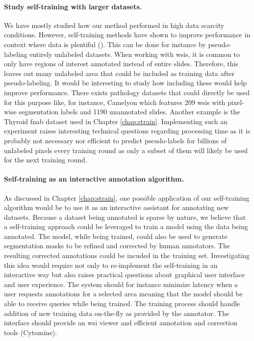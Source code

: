 \paragraph{Study self-training with larger datasets.} We have mostly studied how our method performed in high data scarcity conditions. However, self-training methods have shown to improve performance in context where data is plentiful (\eg \cite{zoph2020rethinking}). This can be done for instance by pseudo-labeling entirely unlabeled datasets. When working with \acrlong{wsi}s, it is common to only have regions of interest annotated instead of entire slides. Therefore, this leaves out many unlabeled area that could be included as training data after pseudo-labeling. It would be interesting to study how including these would help improve performance. There exists pathology datasets that could directly be used for this purpose like, for instance, Camelyon \cite{litjens2018camelyon} which features 209 \acrlong{wsi}s with pixel-wise segmentation labels and 1190 unannotated slides. Another example is the Thyroid \acrshort{fnab} dataset used in Chapter \ref{chap:strain}. Implementing such an experiment raises interesting technical questions regarding processing time as it is probably not necessary nor efficient to predict pseudo-labels for billions of unlabeled pixels every training round as only a subset of them will likely be used for the next training round.  

\paragraph{Self-training as an interactive annotation algorithm.} As discussed in Chapter \ref{chap:strain}, one possible application of our self-training algorithm would be to use it as an interactive assistant for annotating new datasets. Because a dataset being annotated is sparse by nature, we believe that a self-training approach could be leveraged to train a model using the data being annotated. The model, while being trained, could also be used to generate segmentation masks to be refined and corrected by human annotators. The resulting corrected annotations could be incuded in the training set. Investigating this idea would require not only to re-implement the self-training in an interactive way but also raises practical questions about graphical user interface and user experience. The system should for instance minimize latency when a user requests annotations for a selected area meaning that the model should be able to receive queries while being trained. The training process should handle addition of new training data on-the-fly as provided by the annotator. The interface should provide an \acrshort{wsi} viewer and efficient annotation and correction tools (\eg Cytomine).

